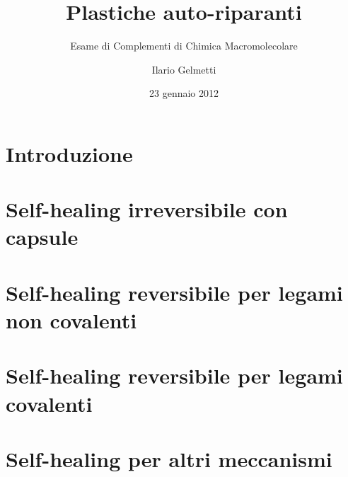\documentclass{beamer}
\title{Plastiche auto-riparanti}
\subtitle{Esame di Complementi di Chimica Macromolecolare}
\author{Ilario Gelmetti}
\institute{Scuola Normale Superiore di Pisa.\\Professore Giancarlo Galli.}
\date{23 gennaio 2012}
\begin{document}
\begin{frame}
  \titlepage
\end{frame}




\section{Introduzione}

\section{Self-healing irreversibile con capsule}

\section{Self-healing reversibile per legami non covalenti}

\section{Self-healing reversibile per legami covalenti}

\section{Self-healing per altri meccanismi}

\end{document}
